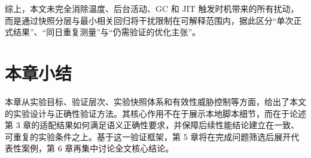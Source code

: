 综上，本文未完全消除温度、后台活动、GC 和 JIT 触发时机带来的所有扰动，而是通过快照分层与最小相关回归将干扰限制在可解释范围内，据此区分“单次正式结果”、“同日重复测量”与“仍需验证的优化主张”。

\section{本章小结}

本章从实验目标、验证层次、实验快照体系和有效性威胁控制等方面，给出了本文的实验设计与正确性验证方法。其核心作用不在于展示本地脚本细节，而在于论述第 3 章的适配结果如何满足语义正确性要求，并保障后续性能结论建立在一致、可重复的实验条件之上。基于这一验证框架，第 5 章将在完成问题筛选后展开代表性案例，第 6 章再集中讨论全文核心结论。
